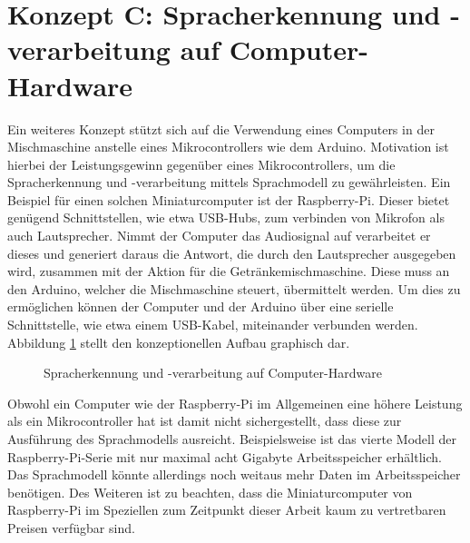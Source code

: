 \section{Konzept C: Spracherkennung und -verarbeitung auf Computer-Hardware}
Ein weiteres Konzept stützt sich auf die Verwendung eines Computers in der Mischmaschine anstelle eines Mikrocontrollers wie dem Arduino.
Motivation ist hierbei der Leistungsgewinn gegenüber eines Mikrocontrollers, um die Spracherkennung und -verarbeitung mittels Sprachmodell zu gewährleisten.
Ein Beispiel für einen solchen Miniaturcomputer ist der Raspberry-Pi.
Dieser bietet genügend Schnittstellen, wie etwa USB-Hubs, zum verbinden von Mikrofon als auch Lautsprecher.
Nimmt der Computer das Audiosignal auf verarbeitet er dieses und generiert daraus die Antwort, die durch den Lautsprecher ausgegeben wird, zusammen mit der Aktion für die Getränkemischmaschine.
Diese muss an den Arduino, welcher die Mischmaschine steuert, übermittelt werden.
Um dies zu ermöglichen können der Computer und der Arduino über eine serielle Schnittstelle, wie etwa einem USB-Kabel, miteinander  verbunden werden.
Abbildung \ref{figure:Konzept_Raspberry} stellt den konzeptionellen Aufbau graphisch dar.
\begin{figure}[H]
    \centering
    \caption{\label{figure:Konzept_Raspberry}Spracherkennung und -verarbeitung auf Computer-Hardware}
\end{figure}
\noindent
Obwohl ein Computer wie der Raspberry-Pi im Allgemeinen eine höhere Leistung als ein Mikrocontroller hat ist damit nicht sichergestellt, dass diese zur Ausführung des Sprachmodells ausreicht.
Beispielsweise ist das vierte Modell der Raspberry-Pi-Serie mit nur maximal acht Gigabyte Arbeitsspeicher erhältlich.
Das Sprachmodell könnte allerdings noch weitaus mehr Daten im Arbeitsspeicher benötigen.
Des Weiteren ist zu beachten, dass die Miniaturcomputer von Raspberry-Pi im Speziellen zum Zeitpunkt dieser Arbeit kaum zu vertretbaren Preisen verfügbar sind.
